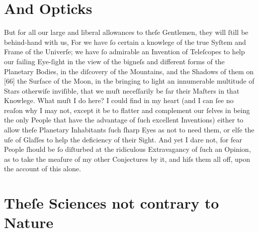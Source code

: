\documentclass[letterpaper]{book}
\begin{document}
\section{And Opticks}

But for all our large and liberal allowances to theſe Gentlemen, they will
ſtill be behind-hand with us, For we have ſo certain a knowlege of the
true Syſtem and Frame of the Univerſe; we have ſo admirable an Invention
of Teleſcopes to help our failing Eye-ſight in the view of the bigneſs and
different forms of the Planetary Bodies, in the diſcovery of the Mountains,
and the Shadows of them on [66] the Surface of the Moon, in the bringing
to light an innumerable multitude of Stars otherwiſe inviſible, that we muſt
neceſſarily be far their Maſters in that Knowlege. What muſt I do here? I
could find in my heart (and I can ſee no reaſon why I may not, except it
be to flatter and complement our ſelves in being the only People that have
the advantage of ſuch excellent Inventions) either to allow theſe Planetary
Inhabitants ſuch ſharp Eyes as not to need them, or elſe the uſe of Glaſſes
to help the deficiency of their Sight. And yet I dare not, for fear People
ſhould be ſo diſturbed at the ridiculous Extravagancy of ſuch an Opinion,
as to take the meaſure of my other Conjectures by it, and hiſs them all off,
upon the account of this alone.


\section{Theſe Sciences not contrary to Nature}
\end{document}
